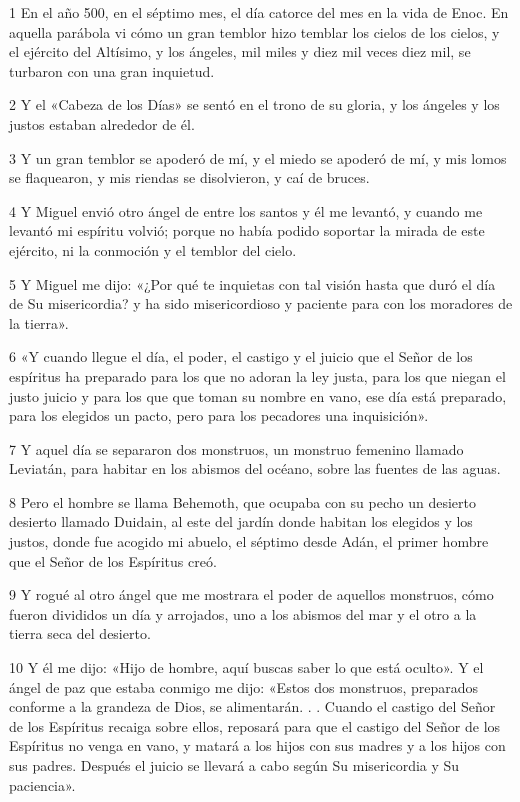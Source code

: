 \par 1 En el año 500, en el séptimo mes, el día catorce del mes en la vida de Enoc. En aquella parábola vi cómo un gran temblor hizo temblar los cielos de los cielos, y el ejército del Altísimo, y los ángeles, mil miles y diez mil veces diez mil, se turbaron con una gran inquietud.
\par 2 Y el «Cabeza de los Días» se sentó en el trono de su gloria, y los ángeles y los justos estaban alrededor de él.
\par 3 Y un gran temblor se apoderó de mí, y el miedo se apoderó de mí, y mis lomos se flaquearon, y mis riendas se disolvieron, y caí de bruces.
\par 4 Y Miguel envió otro ángel de entre los santos y él me levantó, y cuando me levantó mi espíritu volvió; porque no había podido soportar la mirada de este ejército, ni la conmoción y el temblor del cielo.
\par 5 Y Miguel me dijo: «¿Por qué te inquietas con tal visión hasta que duró el día de Su misericordia? y ha sido misericordioso y paciente para con los moradores de la tierra».
\par 6 «Y cuando llegue el día, el poder, el castigo y el juicio que el Señor de los espíritus ha preparado para los que no adoran la ley justa, para los que niegan el justo juicio y para los que que toman su nombre en vano, ese día está preparado, para los elegidos un pacto, pero para los pecadores una inquisición».
\par 7 Y aquel día se separaron dos monstruos, un monstruo femenino llamado Leviatán, para habitar en los abismos del océano, sobre las fuentes de las aguas.
\par 8 Pero el hombre se llama Behemoth, que ocupaba con su pecho un desierto desierto llamado Duidain, al este del jardín donde habitan los elegidos y los justos, donde fue acogido mi abuelo, el séptimo desde Adán, el primer hombre que el Señor de los Espíritus creó.
\par 9 Y rogué al otro ángel que me mostrara el poder de aquellos monstruos, cómo fueron divididos un día y arrojados, uno a los abismos del mar y el otro a la tierra seca del desierto.
\par 10 Y él me dijo: «Hijo de hombre, aquí buscas saber lo que está oculto». Y el ángel de paz que estaba conmigo me dijo: «Estos dos monstruos, preparados conforme a la grandeza de Dios, se alimentarán. . . Cuando el castigo del Señor de los Espíritus recaiga sobre ellos, reposará para que el castigo del Señor de los Espíritus no venga en vano, y matará a los hijos con sus madres y a los hijos con sus padres. Después el juicio se llevará a cabo según Su misericordia y Su paciencia».
